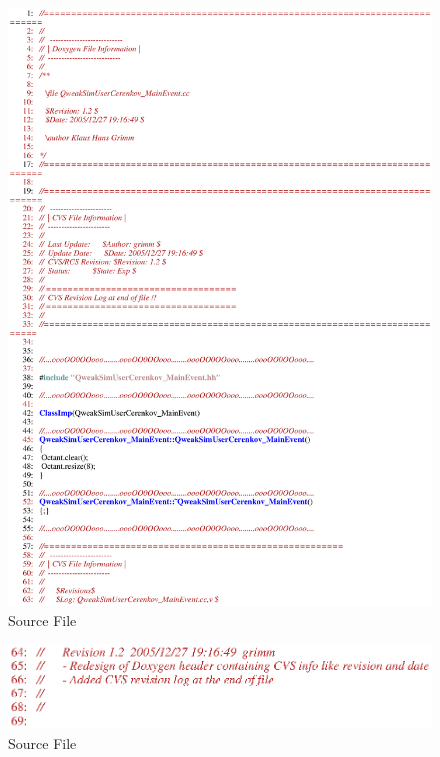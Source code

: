 \begin{figure}[ht]
  \hspace{0cm}
  \includegraphics[scale=0.8]{./figures5/QweakSimUserCerenkov_MainEvent.cc-p1.eps}
  \caption{\label{SourceV26} Source File}
           \label{fig:V-SC-30}
\end{figure}

\clearpage

\begin{figure}[ht]
  \hspace{0cm}
  \includegraphics[scale=0.8]{./figures5/QweakSimUserCerenkov_MainEvent.cc-p2.eps}
  \caption{\label{SourceV27} Source File}
           \label{fig:V-SC-31}
\end{figure}

